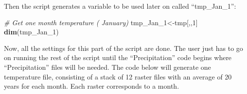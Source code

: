 \documentclass[
  10pt,
  b5paper,
]{book}
\newenvironment{Shaded}{\begin{snugshade}}{\end{snugshade}}
\newcommand{\CommentTok}[1]{\textcolor[rgb]{0.56,0.35,0.01}{\textit{#1}}}
\newcommand{\DecValTok}[1]{\textcolor[rgb]{0.00,0.00,0.81}{#1}}
\newcommand{\KeywordTok}[1]{\textcolor[rgb]{0.13,0.29,0.53}{\textbf{#1}}}
\newcommand{\NormalTok}[1]{#1}
\begin{document}
Then the script generates a variable to be used later on called ``tmp\_Jan\_1'':

\begin{Shaded}
\begin{Highlighting}[]
\CommentTok{# Get one month temperature ( January)}
\NormalTok{ tmp_Jan_}\DecValTok{1}\NormalTok{<-tmp[,,}\DecValTok{1}\NormalTok{]}
 \KeywordTok{dim}\NormalTok{(tmp_Jan_}\DecValTok{1}\NormalTok{)}
\end{Highlighting}
\end{Shaded}

Now, all the settings for this part of the script are done. The user just has to go on running the rest of the script until the ``Precipitation'' code begins where ``Precipitation'' files will be needed.
The code below will generate one temperature file, consisting of a stack of 12 raster files with an average of 20 years for each month. Each raster corresponds to a month.
\end{document}
